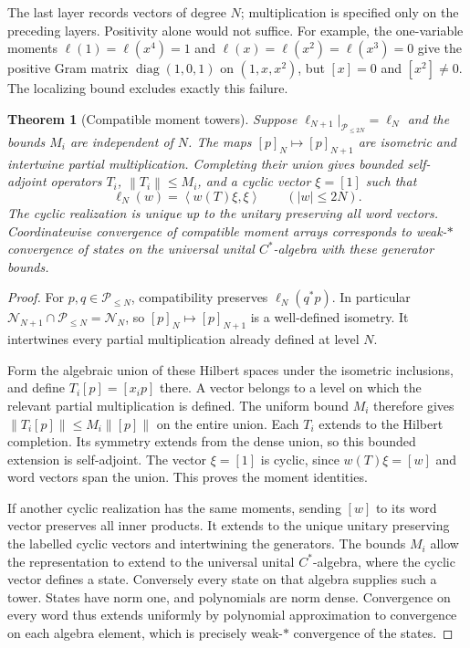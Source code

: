 \documentclass[11pt,a4paper]{amsart}
\numberwithin{equation}{section}
\newtheorem{theorem}{Theorem}[section]
\theoremstyle{definition}
\theoremstyle{remark}
\newcommand{\PP}{\mathcal P}
\DeclareMathOperator{\diag}{diag}
\newcommand{\norm}[1]{\left\lVert#1\right\rVert}
\newcommand{\ip}[2]{\left\langle#1,#2\right\rangle}
\begin{document}
The last layer records vectors of degree $N$; multiplication is specified only on the preceding layers. Positivity alone would not suffice. For example, the one-variable moments $\ell(1)=\ell(x^4)=1$ and $\ell(x)=\ell(x^2)=\ell(x^3)=0$ give the positive Gram matrix $\diag(1,0,1)$ on $(1,x,x^2)$, but $[x]=0$ and $[x^2]\ne0$. The localizing bound excludes exactly this failure.

\begin{theorem}[Compatible moment towers]\label{thm:gnstower}
Suppose $\ell_{N+1}|_{\PP_{\le2N}}=\ell_N$ and the bounds $M_i$ are independent of $N$. The maps $[p]_N\mapsto[p]_{N+1}$ are isometric and intertwine partial multiplication. Completing their union gives bounded self-adjoint operators $T_i$, $\norm{T_i}\le M_i$, and a cyclic vector $\xi=[1]$ such that
\[
 \ell_N(w)=\ip{w(T)\xi}{\xi}\qquad(|w|\le2N).
\]
The cyclic realization is unique up to the unitary preserving all word vectors. Coordinatewise convergence of compatible moment arrays corresponds to weak-$*$ convergence of states on the universal unital $C^*$-algebra with these generator bounds.
\end{theorem}
\begin{proof}
For $p,q\in\PP_{\le N}$, compatibility preserves $\ell_N(q^*p)$. In particular
$\mathcal N_{N+1}\cap\PP_{\le N}=\mathcal N_N$,
so $[p]_N\mapsto[p]_{N+1}$ is a well-defined isometry. It intertwines every partial multiplication already defined at level $N$.

Form the algebraic union of these Hilbert spaces under the isometric inclusions, and define $T_i[p]=[x_ip]$ there. A vector belongs to a level on which the relevant partial multiplication is defined. The uniform bound $M_i$ therefore gives $\norm{T_i[p]}\le M_i\norm{[p]}$ on the entire union. Each $T_i$ extends to the Hilbert completion. Its symmetry extends from the dense union, so this bounded extension is self-adjoint. The vector $\xi=[1]$ is cyclic, since $w(T)\xi=[w]$ and word vectors span the union. This proves the moment identities.

If another cyclic realization has the same moments, sending $[w]$ to its word vector preserves all inner products. It extends to the unique unitary preserving the labelled cyclic vectors and intertwining the generators. The bounds $M_i$ allow the representation to extend to the universal unital $C^*$-algebra, where the cyclic vector defines a state. Conversely every state on that algebra supplies such a tower. States have norm one, and polynomials are norm dense. Convergence on every word thus extends uniformly by polynomial approximation to convergence on each algebra element, which is precisely weak-$*$ convergence of the states.
\end{proof}
\end{document}
